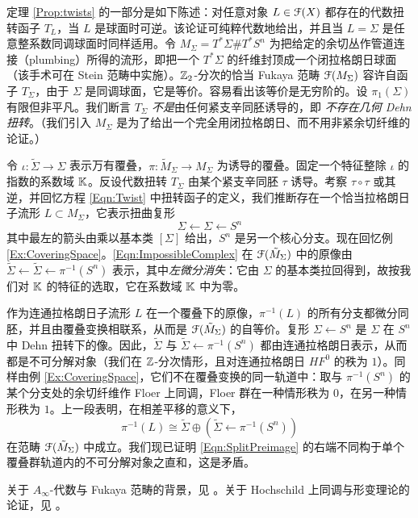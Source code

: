 定理 \ref{Prop:twists} 的一部分是如下陈述：对任意对象 $L \in \EuScript{F}(X)$ 都存在的代数扭转函子 $T_L$，当 $L$ 是球面时可逆。该论证可纯粹代数地给出，并且当 $L=\Sigma$ 是任意整系数同调球面时同样适用。令 $M_{\Sigma} = T^*\Sigma\#T^*S^n$ 为把给定的余切丛作管道连接（plumbing）所得的流形，即把一个 $T^*\Sigma$ 的纤维封顶成一个闭拉格朗日球面（该手术可在 Stein 范畴中实施）。$\mathbb{Z}_2$-分次的恰当 Fukaya 范畴 $\EuScript{F}(M_{\Sigma})$ 容许自函子 $T_{\Sigma}$，由于 $\Sigma$ 是同调球面，它是等价。容易看出该等价是无穷阶的。设 $\pi_1(\Sigma)$ 有限但非平凡。我们断言 $T_{\Sigma}$ \emph{不是}由任何紧支辛同胚诱导的，即 \emph{不存在几何 Dehn 扭转}。（我们引入 $M_\Sigma$ 是为了给出一个完全用闭拉格朗日、而不用非紧余切纤维的论证。）

令 $\iota: \tilde{\Sigma} \rightarrow \Sigma$ 表示万有覆叠，$\pi: \tilde{M}_{\Sigma} \rightarrow M_{\Sigma}$ 为诱导的覆叠。固定一个特征整除 $\iota$ 的指数的系数域 $\mathbb{K}$。反设代数扭转 $T_{\Sigma}$ 由某个紧支辛同胚 $\tau$ 诱导。考察 $\tau \circ \tau$ 或其逆，并回忆方程 \ref{Eqn:Twist} 中扭转函子的定义，我们推断存在一个恰当拉格朗日子流形 $L \subset M_{\Sigma}$，它表示扭曲复形
\begin{equation} \label{Eqn:ImpossibleComplex}
\Sigma \leftarrow \Sigma \leftarrow S^n
\end{equation}
其中最左的箭头由乘以基本类 $[\Sigma]$ 给出，$S^n$ 是另一个核心分支。现在回忆例 \ref{Ex:CoveringSpace}。\eqref{Eqn:ImpossibleComplex} 在 $\EuScript{F}(\tilde{M}_{\Sigma})$ 中的原像由 $\tilde{\Sigma} \leftarrow \tilde{\Sigma} \leftarrow \pi^{-1}(S^n)$ 表示，其中\emph{左微分消失}：它由 $\Sigma$ 的基本类拉回得到，故按我们对 $\mathbb{K}$ 的特征的选取，它在系数域 $\mathbb{K}$ 中为零。

作为连通拉格朗日子流形 $L$ 在一个覆叠下的原像，$\pi^{-1}(L)$ 的所有分支都微分同胚，并且由覆叠变换相联系，从而是 $\EuScript{F}(\tilde{M}_{\Sigma})$ 的自等价。复形 $\Sigma \leftarrow S^n$ 是 $\Sigma$ 在 $S^n$ 中 Dehn 扭转下的像。因此，$\tilde{\Sigma}$ 与 $\tilde{\Sigma} \leftarrow \pi^{-1}(S^n)$ 都由连通拉格朗日表示，从而都是不可分解对象（我们在 $\mathbb{Z}$-分次情形，且对连通拉格朗日 $HF^0$ 的秩为 $1$）。同样由例 \ref{Ex:CoveringSpace}，它们不在覆叠变换的同一轨道中：取与 $  \pi^{-1}(S^n)$ 的某个分支处的余切纤维作 Floer 上同调，Floer 群在一种情形秩为 $0$，在另一种情形秩为 $1$。上一段表明，在相差平移的意义下，
\begin{equation} \label{Eqn:SplitPreimage}
\pi^{-1}(L) \cong \tilde{\Sigma} \oplus \left( \tilde{\Sigma} \leftarrow \pi^{-1}(S^n) \right)
\end{equation}
在范畴 $\EuScript{F}(\tilde{M}_{\Sigma})$ 中成立。我们现已证明 \eqref{Eqn:SplitPreimage} 的右端不同构于单个覆叠群轨道内的不可分解对象之直和，这是矛盾。

\begin{Notes} 关于 $A_{\infty}$-代数与 Fukaya 范畴的背景，见 \cite{FCPLT, FO3}。关于 Hochschild 上同调与形变理论的论证，见 \cite{Seidel:HMSquartic, Seidel:HMSgenus2}。
\end{Notes}
